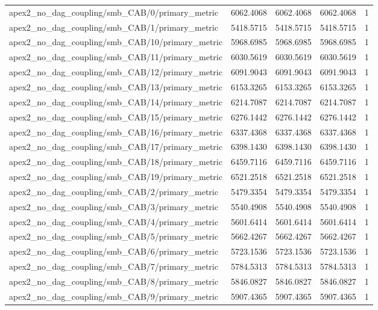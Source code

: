 \begin{table}[h]
\begin{tabular}{lrrrr}
apex2_no_dag_coupling/smb_CAB/0/primary_metric & 6062.4068 & 6062.4068 & 6062.4068 & 1 \\
apex2_no_dag_coupling/smb_CAB/1/primary_metric & 5418.5715 & 5418.5715 & 5418.5715 & 1 \\
apex2_no_dag_coupling/smb_CAB/10/primary_metric & 5968.6985 & 5968.6985 & 5968.6985 & 1 \\
apex2_no_dag_coupling/smb_CAB/11/primary_metric & 6030.5619 & 6030.5619 & 6030.5619 & 1 \\
apex2_no_dag_coupling/smb_CAB/12/primary_metric & 6091.9043 & 6091.9043 & 6091.9043 & 1 \\
apex2_no_dag_coupling/smb_CAB/13/primary_metric & 6153.3265 & 6153.3265 & 6153.3265 & 1 \\
apex2_no_dag_coupling/smb_CAB/14/primary_metric & 6214.7087 & 6214.7087 & 6214.7087 & 1 \\
apex2_no_dag_coupling/smb_CAB/15/primary_metric & 6276.1442 & 6276.1442 & 6276.1442 & 1 \\
apex2_no_dag_coupling/smb_CAB/16/primary_metric & 6337.4368 & 6337.4368 & 6337.4368 & 1 \\
apex2_no_dag_coupling/smb_CAB/17/primary_metric & 6398.1430 & 6398.1430 & 6398.1430 & 1 \\
apex2_no_dag_coupling/smb_CAB/18/primary_metric & 6459.7116 & 6459.7116 & 6459.7116 & 1 \\
apex2_no_dag_coupling/smb_CAB/19/primary_metric & 6521.2518 & 6521.2518 & 6521.2518 & 1 \\
apex2_no_dag_coupling/smb_CAB/2/primary_metric & 5479.3354 & 5479.3354 & 5479.3354 & 1 \\
apex2_no_dag_coupling/smb_CAB/3/primary_metric & 5540.4908 & 5540.4908 & 5540.4908 & 1 \\
apex2_no_dag_coupling/smb_CAB/4/primary_metric & 5601.6414 & 5601.6414 & 5601.6414 & 1 \\
apex2_no_dag_coupling/smb_CAB/5/primary_metric & 5662.4267 & 5662.4267 & 5662.4267 & 1 \\
apex2_no_dag_coupling/smb_CAB/6/primary_metric & 5723.1536 & 5723.1536 & 5723.1536 & 1 \\
apex2_no_dag_coupling/smb_CAB/7/primary_metric & 5784.5313 & 5784.5313 & 5784.5313 & 1 \\
apex2_no_dag_coupling/smb_CAB/8/primary_metric & 5846.0827 & 5846.0827 & 5846.0827 & 1 \\
apex2_no_dag_coupling/smb_CAB/9/primary_metric & 5907.4365 & 5907.4365 & 5907.4365 & 1 \\

\end{tabular}
\end{table}
